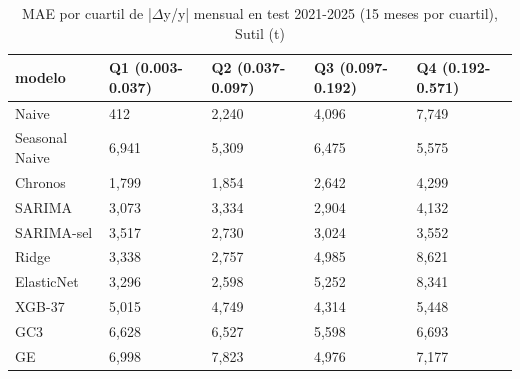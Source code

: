 \begin{table}[H]
\centering
\small
\caption{MAE por cuartil de |$\Delta$y/y| mensual en test 2021-2025 (15 meses por cuartil), Sutil (t)}
\label{tab:T13_cuartiles_sutil}
\begin{tabular}{lllll}
\toprule
modelo & Q1 (0.003-0.037) & Q2 (0.037-0.097) & Q3 (0.097-0.192) & Q4 (0.192-0.571) \\
\midrule
Naive & 412 & 2,240 & 4,096 & 7,749 \\
Seasonal Naive & 6,941 & 5,309 & 6,475 & 5,575 \\
Chronos & 1,799 & 1,854 & 2,642 & 4,299 \\
SARIMA & 3,073 & 3,334 & 2,904 & 4,132 \\
SARIMA-sel & 3,517 & 2,730 & 3,024 & 3,552 \\
Ridge & 3,338 & 2,757 & 4,985 & 8,621 \\
ElasticNet & 3,296 & 2,598 & 5,252 & 8,341 \\
XGB-37 & 5,015 & 4,749 & 4,314 & 5,448 \\
GC3 & 6,628 & 6,527 & 5,598 & 6,693 \\
GE & 6,998 & 7,823 & 4,976 & 7,177 \\
\bottomrule
\end{tabular}
\end{table}